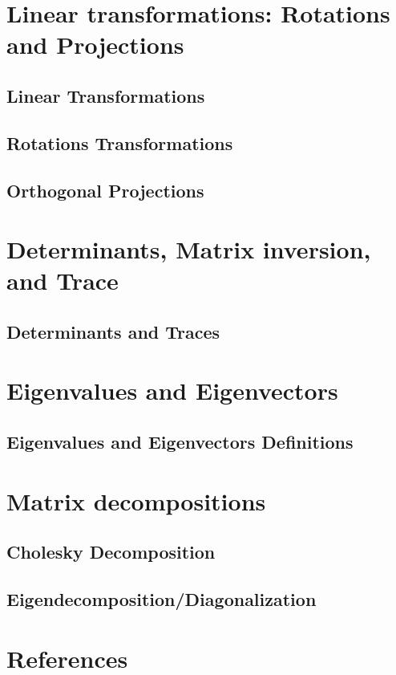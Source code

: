\documentclass[11pt]{beamer}
\begin{document}
\section{Linear transformations: Rotations and Projections}
\subsection{Linear Transformations}


\subsection{Rotations Transformations}


\subsection{Orthogonal Projections}


\section{Determinants, Matrix inversion, and Trace}
\subsection{Determinants and Traces}



\section{Eigenvalues and Eigenvectors}
\subsection{Eigenvalues and Eigenvectors Definitions}


\section{Matrix decompositions}
\subsection{Cholesky Decomposition}


\subsection{Eigendecomposition/Diagonalization}



\section{References}

\end{document}
